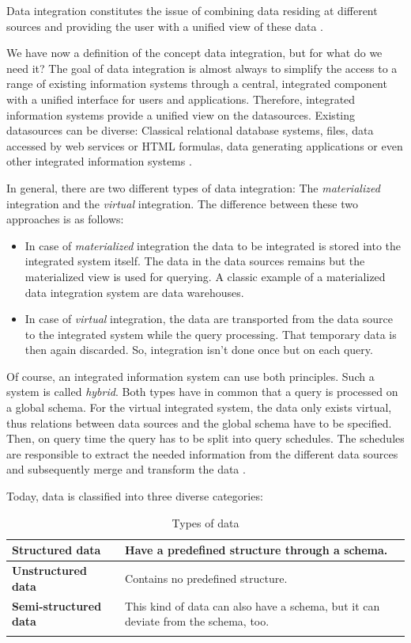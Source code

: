 Data integration constitutes the issue of combining data residing at different sources and providing the user with a unified view of these data \cite{Lenzerini:2002:DIT:543613.543644}. 

We have now a definition of the concept data integration, but for what do we need it? The goal of data integration is almost always to simplify the access to a range of existing information systems through a central, integrated component with a unified interface for users and applications. Therefore, integrated information systems provide a unified view on the datasources. Existing datasources can be diverse: Classical relational database systems, files, data accessed by web services or HTML formulas, data generating applications or even other integrated information systems \cite[p. 3-4]{DBLP:books/dp/LeserN2006}.

In general, there are two different types of data integration: The \emph{materialized} integration and the \emph{virtual} integration. The difference between these two approaches is as follows:
\begin{itemize}
 \item \label{materialized_index}In case of \emph{materialized} integration the data to be integrated is stored  into the integrated system itself. The data in the data sources remains but the materialized view is used for querying. A classic example of a materialized data integration system are data warehouses.
 \item \label{virtual_index}In case of \emph{virtual} integration, the data are transported from the data source to the integrated system while the query processing. That temporary data is then again discarded. So, integration isn't done once but on each query.
\end{itemize}
Of course, an integrated information system can use both principles. Such a system is called \emph{hybrid}\label{hybrid_index}. Both types have in common that a query is processed on a global schema. For the virtual integrated system, the data only exists virtual, thus relations between data sources and the global schema have to be specified. Then, on query time the query has to be split into query schedules. The schedules are responsible to extract the needed information from the different data sources and subsequently merge and transform the data \cite[p. 86-88]{DBLP:books/dp/LeserN2006}.

Today, data is classified into three diverse categories:
\begin{longtable}{|l|p{}|}
\hline
 \textbf{Structured data}  &  Have a predefined structure through a schema.\\ \hline
 \textbf{Unstructured data}    &  Contains no predefined structure.\\ \hline
 \textbf{Semi-structured data} & This kind of data can also have a schema, but it can deviate from the schema, too.\\ \hline
\caption{Types of data \cite[p. 17]{DBLP:books/dp/LeserN2006}}
\label{type_of_data_label}
\end{longtable}

